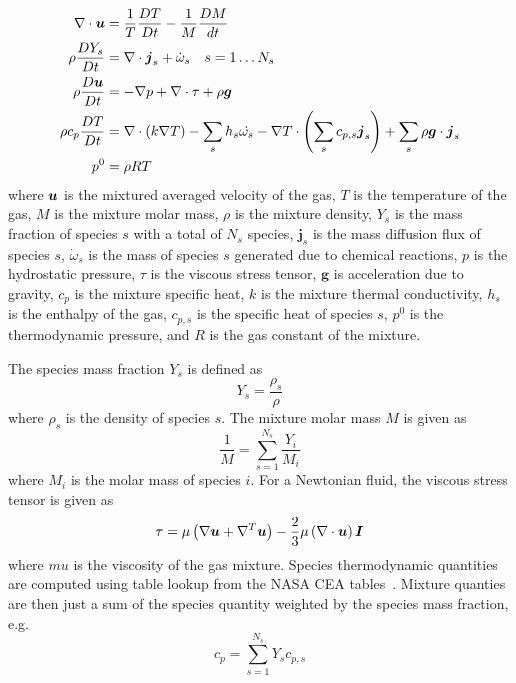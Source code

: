 \begin{equation}
\begin{aligned}
\nabla \cdot \bu &= \frac{1}{T}\frac{DT}{Dt} - \frac{1}{M}\frac{DM}{dt} \\ %
\rho \frac{D Y_s}{D t} &= \nabla \cdot \boldsymbol{j}_s + \dot{\omega}_s \quad s = 1 \dots N_s \\
\rho \frac{D\bu}{Dt} &= -\nabla p + \nabla \cdot \mathbf{\tau} + \rho \boldsymbol{g} \\
\rho c_p \frac{DT}{Dt} %
&= \nabla \cdot \left(k \nabla T \right) - \sum_s h_s \dot{\omega_s} -
\nabla T  \cdot \left( \sum_{s} c_{p,s} \boldsymbol{j}_s \right) +
\sum_{s} \rho \boldsymbol{g} \cdot \boldsymbol{j}_s \\
p^0 &= \rho R T
\end{aligned}
\end{equation}
where $\boldsymbol{u}$ is the mixtured averaged velocity of the gas, $T$ is the temperature of the
gas, $M$ is the mixture molar mass, $\rho$ is the mixture density,
$Y_s$ is the mass fraction of species $s$ with a total of $N_s$ species, $\boldsymbol{j}_s$ is the
mass diffusion flux of species $s$, $\dot{\omega}_s$ is the mass of
species $s$ generated due to chemical reactions, $p$ is the
hydrostatic pressure, $\tau$ is the viscous stress tensor,
$\boldsymbol{g}$ is acceleration due to gravity, $c_p$ is the mixture
specific heat, $k$ is the mixture thermal conductivity, $h_s$ is the
enthalpy of the gas, $c_{p,s}$ is the specific heat of species $s$,
$p^0$ is the thermodynamic pressure, and $R$ is the gas constant of
the mixture.

The species mass fraction $Y_s$ is defined as
%
\begin{equation}
  Y_s = \frac{\rho_s}{\rho}
\end{equation}
%
where $\rho_s$ is the density of species $s$.
The mixture molar mass $M$ is given as
%
\begin{equation}
  \frac{1}{M} = \sum_{s=1}^{N_s} \frac{Y_i}{M_i}
\end{equation}
%
where $M_i$ is the molar mass of species $i$.
%
For a Newtonian fluid, the viscous stress tensor is given as
%
\begin{equation}\label{eq:stress_tensor}
  \tau = \mu\left(\nabla\boldsymbol{u} + \nabla^{T}\boldsymbol{u}\right) -\frac{2}{3}\mu \left(\nabla\cdot\boldsymbol{u}\right)\boldsymbol{I}
\end{equation}
%
where $mu$ is the viscosity of the gas mixture.
%
Species thermodynamic quantities are computed using table lookup from the NASA
CEA tables~\cite{CEATables}.
Mixture quanties are then just a sum of the species
quantity weighted by the species mass fraction, e.g.
%
\begin{equation}
  c_p = \sum_{s=1}^{N_s} Y_s c_{p,s}
\end{equation}
%

